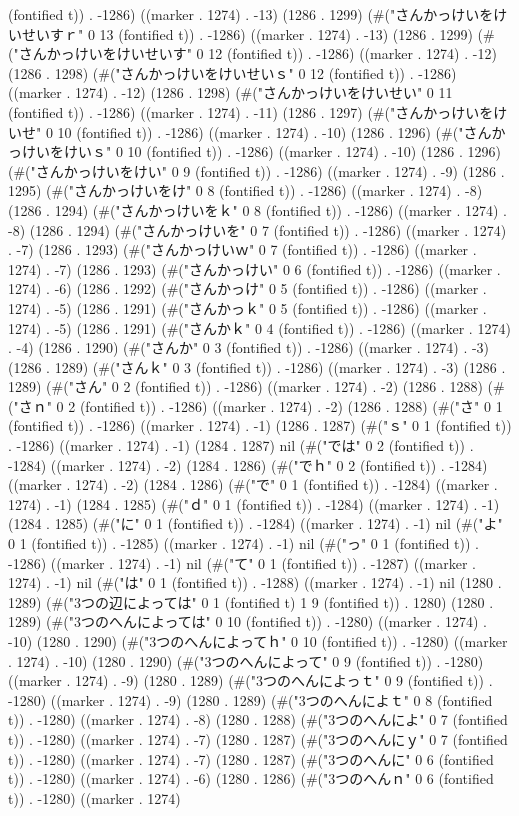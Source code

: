 (fontified t)) . -1286) ((marker . 1274) . -13) (1286 . 1299) (#("さんかっけいをけいせいすｒ" 0 13 (fontified t)) . -1286) ((marker . 1274) . -13) (1286 . 1299) (#("さんかっけいをけいせいす" 0 12 (fontified t)) . -1286) ((marker . 1274) . -12) (1286 . 1298) (#("さんかっけいをけいせいｓ" 0 12 (fontified t)) . -1286) ((marker . 1274) . -12) (1286 . 1298) (#("さんかっけいをけいせい" 0 11 (fontified t)) . -1286) ((marker . 1274) . -11) (1286 . 1297) (#("さんかっけいをけいせ" 0 10 (fontified t)) . -1286) ((marker . 1274) . -10) (1286 . 1296) (#("さんかっけいをけいｓ" 0 10 (fontified t)) . -1286) ((marker . 1274) . -10) (1286 . 1296) (#("さんかっけいをけい" 0 9 (fontified t)) . -1286) ((marker . 1274) . -9) (1286 . 1295) (#("さんかっけいをけ" 0 8 (fontified t)) . -1286) ((marker . 1274) . -8) (1286 . 1294) (#("さんかっけいをｋ" 0 8 (fontified t)) . -1286) ((marker . 1274) . -8) (1286 . 1294) (#("さんかっけいを" 0 7 (fontified t)) . -1286) ((marker . 1274) . -7) (1286 . 1293) (#("さんかっけいｗ" 0 7 (fontified t)) . -1286) ((marker . 1274) . -7) (1286 . 1293) (#("さんかっけい" 0 6 (fontified t)) . -1286) ((marker . 1274) . -6) (1286 . 1292) (#("さんかっけ" 0 5 (fontified t)) . -1286) ((marker . 1274) . -5) (1286 . 1291) (#("さんかっｋ" 0 5 (fontified t)) . -1286) ((marker . 1274) . -5) (1286 . 1291) (#("さんかｋ" 0 4 (fontified t)) . -1286) ((marker . 1274) . -4) (1286 . 1290) (#("さんか" 0 3 (fontified t)) . -1286) ((marker . 1274) . -3) (1286 . 1289) (#("さんｋ" 0 3 (fontified t)) . -1286) ((marker . 1274) . -3) (1286 . 1289) (#("さん" 0 2 (fontified t)) . -1286) ((marker . 1274) . -2) (1286 . 1288) (#("さｎ" 0 2 (fontified t)) . -1286) ((marker . 1274) . -2) (1286 . 1288) (#("さ" 0 1 (fontified t)) . -1286) ((marker . 1274) . -1) (1286 . 1287) (#("ｓ" 0 1 (fontified t)) . -1286) ((marker . 1274) . -1) (1284 . 1287) nil (#("では" 0 2 (fontified t)) . -1284) ((marker . 1274) . -2) (1284 . 1286) (#("でｈ" 0 2 (fontified t)) . -1284) ((marker . 1274) . -2) (1284 . 1286) (#("で" 0 1 (fontified t)) . -1284) ((marker . 1274) . -1) (1284 . 1285) (#("ｄ" 0 1 (fontified t)) . -1284) ((marker . 1274) . -1) (1284 . 1285) (#("に" 0 1 (fontified t)) . -1284) ((marker . 1274) . -1) nil (#("よ" 0 1 (fontified t)) . -1285) ((marker . 1274) . -1) nil (#("っ" 0 1 (fontified t)) . -1286) ((marker . 1274) . -1) nil (#("て" 0 1 (fontified t)) . -1287) ((marker . 1274) . -1) nil (#("は" 0 1 (fontified t)) . -1288) ((marker . 1274) . -1) nil (1280 . 1289) (#("3つの辺によっては" 0 1 (fontified t) 1 9 (fontified t)) . 1280) (1280 . 1289) (#("3つのへんによっては" 0 10 (fontified t)) . -1280) ((marker . 1274) . -10) (1280 . 1290) (#("3つのへんによってｈ" 0 10 (fontified t)) . -1280) ((marker . 1274) . -10) (1280 . 1290) (#("3つのへんによって" 0 9 (fontified t)) . -1280) ((marker . 1274) . -9) (1280 . 1289) (#("3つのへんによっｔ" 0 9 (fontified t)) . -1280) ((marker . 1274) . -9) (1280 . 1289) (#("3つのへんによｔ" 0 8 (fontified t)) . -1280) ((marker . 1274) . -8) (1280 . 1288) (#("3つのへんによ" 0 7 (fontified t)) . -1280) ((marker . 1274) . -7) (1280 . 1287) (#("3つのへんにｙ" 0 7 (fontified t)) . -1280) ((marker . 1274) . -7) (1280 . 1287) (#("3つのへんに" 0 6 (fontified t)) . -1280) ((marker . 1274) . -6) (1280 . 1286) (#("3つのへんｎ" 0 6 (fontified t)) . -1280) ((marker . 1274) 